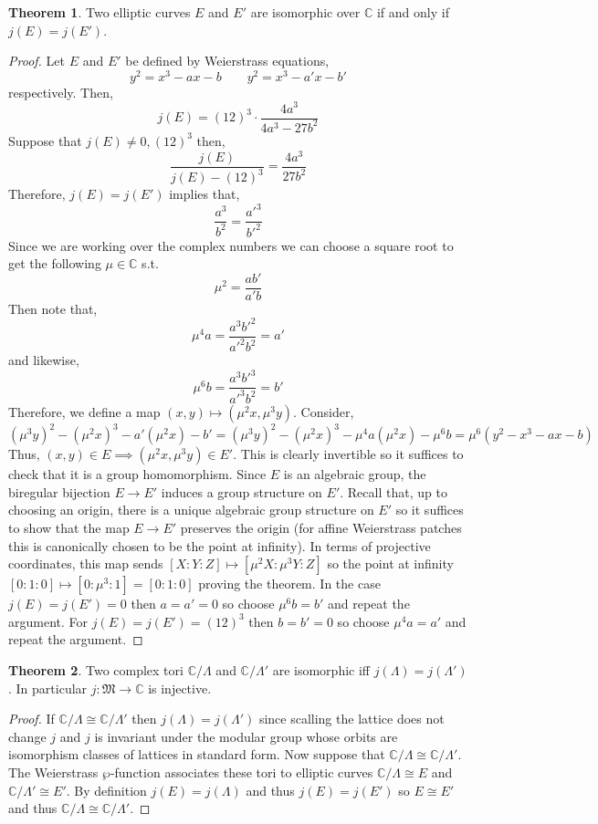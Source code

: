 \documentclass{article}
\newcommand{\C}{\mathbb{C}}
\theoremstyle{definition}
\newtheorem{theorem}{Theorem}[section]
\begin{document}
\begin{theorem}
Two elliptic curves $E$ and $E'$ are isomorphic over  $\C$ if and only if $j(E) = j(E')$.
\end{theorem}

\begin{proof}
Let $E$ and $E'$ be defined by Weierstrass equations,
\[ y^2 = x^3 - a x - b \quad \quad y^2 = x^3 - a' x - b' \]
respectively. Then,
\[ j(E) = (12)^3 \cdot \frac{4 a^3}{4 a^3 - 27 b^2} \]
Suppose that $j(E) \neq 0, (12)^3$ then,
\[ \frac{j(E)}{j(E) - (12)^3} = \frac{4 a^3}{27 b^2} \]
Therefore, $j(E) = j(E')$ implies that,
\[ \frac{a^3}{b^2} = \frac{a'^3}{b'^2} \]
Since we are working over the complex numbers we can choose a square root to get the following $\mu \in \C$ s.t.
\[ \mu^2 = \frac{a b'}{a' b} \]
Then note that,
\[ \mu^4 a = \frac{a^3 b'^2}{a'^2 b^2} = a' \]
and likewise,
\[ \mu^6  b = \frac{a^3 b'^3}{a'^3 b^2} = b' \]
Therefore, we define a map $(x, y) \mapsto (\mu^2 x, \mu^3 y)$. Consider,
\[ (\mu^3 y)^2 - (\mu^2 x)^3 - a' (\mu^2 x) -  b' = (\mu^3 y)^2 - (\mu^2 x)^3 - \mu^4 a (\mu^2 x) - \mu^6 b  = \mu^6 (y^2 - x^3 - a x - b) \] 
Thus, $(x, y) \in E \implies (\mu^2 x, \mu^3 y) \in E'$. This is clearly invertible so it suffices to check that it is a group homomorphism. Since $E$ is an algebraic group, the biregular bijection $E \to E'$ induces a group structure on $E'$. Recall that, up to choosing an origin, there is a unique algebraic group structure on $E'$ so it suffices to show that the map $E \to E'$ preserves the origin (for affine Weierstrass patches this is canonically chosen to be the point at infinity). In terms of projective coordinates, this map sends $[X : Y : Z] \mapsto [\mu^2 X : \mu^3 Y : Z]$ so the point at infinity $[0 : 1 : 0] \mapsto [0 : \mu^3 : 1] = [0 : 1 : 0]$ proving the theorem. In the case $j(E) = j(E') = 0$ then $a = a' = 0$ so choose $\mu^6 b = b'$ and repeat the argument. For $j(E) = j(E') = (12)^3$ then $b = b' = 0$ so choose $\mu^4 a = a'$ and repeat the argument. 
\end{proof}

\begin{theorem}
Two complex tori $\C / \Lambda$ and $\C / \Lambda'$ are isomorphic iff $j(\Lambda) = j(\Lambda')$. In particular $j : \mathfrak{M} \to \C$ is injective.
\end{theorem}

\begin{proof}
If $\C / \Lambda \cong \C / \Lambda'$ then $j(\Lambda) = j(\Lambda')$ since scalling the lattice does not change $j$ and $j$ is invariant under the modular group whose orbits are isomorphism classes of lattices in standard form. Now suppose that $\C / \Lambda \cong \C / \Lambda'$. The Weierstrass $\wp$-function associates these tori to elliptic curves $\C / \Lambda \cong E$ and $\C / \Lambda' \cong E'$. By definition $j(E) = j(\Lambda)$ and thus $j(E) = j(E')$ so $E \cong E'$ and thus $\C / \Lambda \cong \C / \Lambda'$.  
\end{proof}
\end{document}

